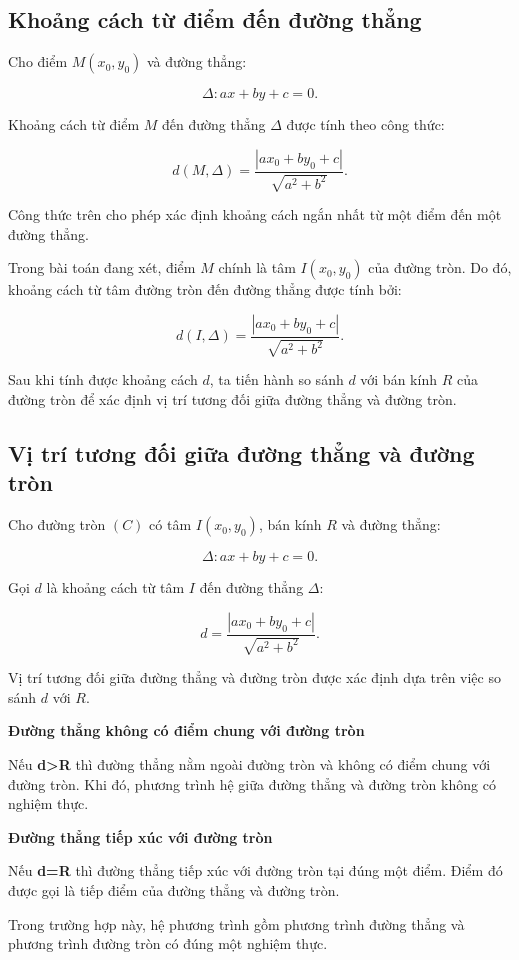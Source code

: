 \documentclass[12pt,a4paper]{article}
\begin{document}
\subsection{Khoảng cách từ điểm đến đường thẳng}

Cho điểm $M(x_0,y_0)$ và đường thẳng:

\[
\Delta: ax+by+c=0.
\]

Khoảng cách từ điểm $M$ đến đường thẳng $\Delta$ được tính theo công thức:

\[
d(M,\Delta)
=
\frac{|ax_0+by_0+c|}
{\sqrt{a^2+b^2}}.
\]

Công thức trên cho phép xác định khoảng cách ngắn nhất từ một điểm đến một đường thẳng.

Trong bài toán đang xét, điểm $M$ chính là tâm $I(x_0,y_0)$ của đường tròn. Do đó, khoảng cách từ tâm đường tròn đến đường thẳng được tính bởi:

\[
d(I,\Delta)
=
\frac{|ax_0+by_0+c|}
{\sqrt{a^2+b^2}}.
\]

Sau khi tính được khoảng cách $d$, ta tiến hành so sánh $d$ với bán kính $R$ của đường tròn để xác định vị trí tương đối giữa đường thẳng và đường tròn.


\subsection{Vị trí tương đối giữa đường thẳng và đường tròn}

Cho đường tròn $(C)$ có tâm $I(x_0,y_0)$, bán kính $R$ và đường thẳng:

\[
\Delta: ax+by+c=0.
\]

Gọi $d$ là khoảng cách từ tâm $I$ đến đường thẳng $\Delta$:

\[
d=
\frac{|ax_0+by_0+c|}
{\sqrt{a^2+b^2}}.
\]

Vị trí tương đối giữa đường thẳng và đường tròn được xác định dựa trên việc so sánh $d$ với $R$.

\textbf{Đường thẳng không có điểm chung với đường tròn}

Nếu \textbf{d>R} thì đường thẳng nằm ngoài đường tròn và không có điểm chung với đường tròn. Khi đó, phương trình hệ giữa đường thẳng và đường tròn không có nghiệm thực.


\textbf{Đường thẳng tiếp xúc với đường tròn}

Nếu \textbf{d=R} thì đường thẳng tiếp xúc với đường tròn tại đúng một điểm. Điểm đó được gọi là tiếp điểm của đường thẳng và đường tròn.

Trong trường hợp này, hệ phương trình gồm phương trình đường thẳng và phương trình đường tròn có đúng một nghiệm thực.
\end{document}
